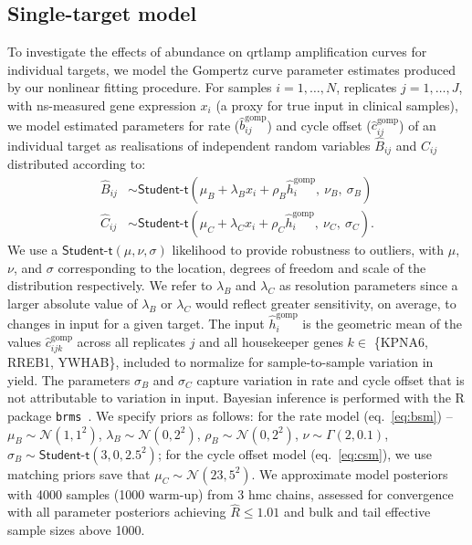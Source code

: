 \documentclass[../thesis.tex]{subfiles}
\begin{document}
\subsection{Single-target model \label{sec:singletargetmodel}}
To investigate the effects of  abundance on \gls{qrtlamp} amplification curves for individual targets, we model the Gompertz curve parameter estimates produced by our nonlinear fitting procedure. For samples $i = 1, \dots, N$, replicates $j = 1, \dots, J$, with \gls{ns}-measured gene expression $x_i$ (a proxy for true  input in clinical samples), we model estimated parameters for rate ($\hat{b}_{ij}^{\text{gomp}}$) and cycle offset ($\hat{c}_{ij}^{\text{gomp}}$) of an individual target as realisations of independent random variables $\hat{B}_{ij}$ and $\hat{C}_{ij}$ distributed according to:
\begin{align} 
    \hat{B}_{ij} & \sim \textsf{Student-t}(\mu_B + \lambda_B x_i + \rho_B \hat{h}^{\text{gomp}}_i, \ \nu_B, \ \sigma_B ) \label{eq:bsm}\\
    \hat{C}_{ij} & \sim \textsf{Student-t}(\mu_C + \lambda_C x_i + \rho_C \hat{h}^{\text{gomp}}_i, \ \nu_C, \ \sigma_C). \label{eq:csm}
\end{align}
We use a $\textsf{Student-t}(\mu,\nu,\sigma)$ likelihood to provide robustness to outliers, with $\mu$, $\nu$, and $\sigma$ corresponding to the location, degrees of freedom and scale of the distribution respectively. We refer to $\lambda_B$ and $\lambda_C$ as resolution parameters since a larger absolute value of $\lambda_B$ or $\lambda_C$ would reflect greater sensitivity, on average, to changes in  input for a given target.
The input $\hat{h}^{\text{gomp}}_{i}$ is the geometric mean of the values $\hat{c}_{ijk}^{\text{gomp}}$ across all replicates $j$ and all housekeeper genes  $k \in$ \{KPNA6, RREB1, YWHAB\}, included to normalize for sample-to-sample variation in  yield. The parameters $\sigma_B$ and $\sigma_C$ capture variation in rate and cycle offset that is not attributable to variation in  input. Bayesian inference is performed with the R package \texttt{brms}~\citep{burkner_brms_2017}. We specify priors as follows: for the rate model (eq.~\ref{eq:bsm}) -- $\mu_B \sim \mathcal{N}(1, 1^2)$, $\lambda_B \sim \mathcal{N}(0, 2^2)$, $\rho_B \sim \mathcal{N}(0, 2^2)$, $\nu \sim \Gamma(2,0.1)$, $\sigma_B \sim \textsf{Student-t}(3, 0, 2.5^2)$; for the cycle offset model (eq.~\ref{eq:csm}), we use matching priors save that $\mu_C \sim \mathcal{N}(23, 5^2)$. We approximate model posteriors with 4000 samples (1000 warm-up) from 3 \gls{hmc} chains, assessed for convergence with all parameter posteriors achieving $\hat{R} \leq 1.01$ and bulk and tail effective sample sizes above 1000.
\end{document}
